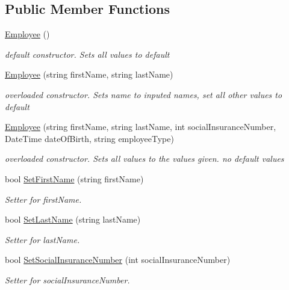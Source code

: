 \subsection*{Public Member Functions}
\begin{DoxyCompactItemize}
\item 
\hyperlink{class_all_employees_1_1_employee_ac3aa5a59bf1ddba2c45cc933bf897e04}{Employee} ()
\begin{DoxyCompactList}\small\item\em default constructor. Sets all values to default \end{DoxyCompactList}\item 
\hyperlink{class_all_employees_1_1_employee_a0a75e7e1786f2c6e5fa482ad79a99234}{Employee} (string first\+Name, string last\+Name)
\begin{DoxyCompactList}\small\item\em overloaded constructor. Sets name to inputed names, set all other values to default \end{DoxyCompactList}\item 
\hyperlink{class_all_employees_1_1_employee_aae0bb0d49eb93ff488771dca5a3db315}{Employee} (string first\+Name, string last\+Name, int social\+Insurance\+Number, Date\+Time date\+Of\+Birth, string employee\+Type)
\begin{DoxyCompactList}\small\item\em overloaded constructor. Sets all values to the values given. no default values \end{DoxyCompactList}\item 
bool \hyperlink{class_all_employees_1_1_employee_ad44ba8da1da1dceb64e1e6f9e6f7c5a3}{Set\+First\+Name} (string first\+Name)
\begin{DoxyCompactList}\small\item\em Setter for first\+Name. \end{DoxyCompactList}\item 
bool \hyperlink{class_all_employees_1_1_employee_a2b5ead1b4de39d2024422c4443034d4c}{Set\+Last\+Name} (string last\+Name)
\begin{DoxyCompactList}\small\item\em Setter for last\+Name. \end{DoxyCompactList}\item 
bool \hyperlink{class_all_employees_1_1_employee_a25c3c9fd99a595fb812b3ba6791f3f11}{Set\+Social\+Insurance\+Number} (int social\+Insurance\+Number)
\begin{DoxyCompactList}\small\item\em Setter for social\+Insurance\+Number. \end{DoxyCompactList}\item 

\end{DoxyCompactItemize}
